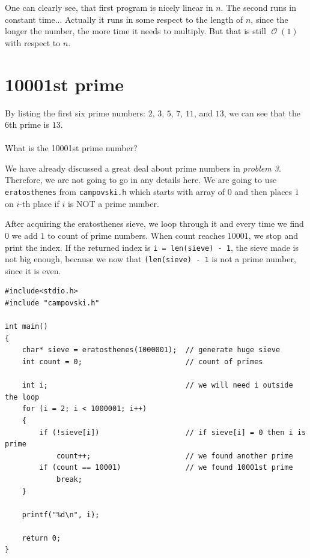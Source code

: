 \documentclass{book}
\DeclareMathOperator{\bigo}{\mathcal{O}}
\newenvironment{task}
  {\begin{mdframed}[backgroundcolor=lightgray]}
  {\end{mdframed}}
\begin{document}
One can clearly see, that first program is nicely linear in $n$. The second runs in constant time... Actually it runs in some respect to the length of $n$, since the longer the number, the more time it needs to multiply. But that is still $\bigo(1)$ with respect to $n$.


\section{10001st prime}

\begin{task}
By listing the first six prime numbers: $2$, $3$, $5$, $7$, $11$, and $13$, we can see that the 6th prime is $13$.\\
\\
What is the 10001st prime number?
\end{task}

We have already discussed a great deal about prime numbers in \textit{problem 3}. Therefore, we are not going to go in any details here. We are going to use \texttt{eratosthenes} from \texttt{campovski.h} which starts with array of $0$ and then places $1$ on $i$-th place if $i$ is NOT a prime number.

After acquiring the eratosthenes sieve, we loop through it and every time we find $0$ we add $1$ to count of prime numbers. When count reaches $10001$, we stop and print the index. If the returned index is \texttt{i = len(sieve) - 1}, the sieve made is not big enough, because we now that \texttt{(len(sieve) - 1} is not a prime number, since it is even.

\begin{verbatim}
#include<stdio.h>
#include "campovski.h"

int main()
{
    char* sieve = eratosthenes(1000001);  // generate huge sieve
    int count = 0;                        // count of primes

    int i;                                // we will need i outside the loop
    for (i = 2; i < 1000001; i++)
    {
        if (!sieve[i])                    // if sieve[i] = 0 then i is prime
            count++;                      // we found another prime
        if (count == 10001)               // we found 10001st prime
            break;
    }

    printf("%d\n", i);

    return 0;
}
\end{verbatim}
\end{document}
